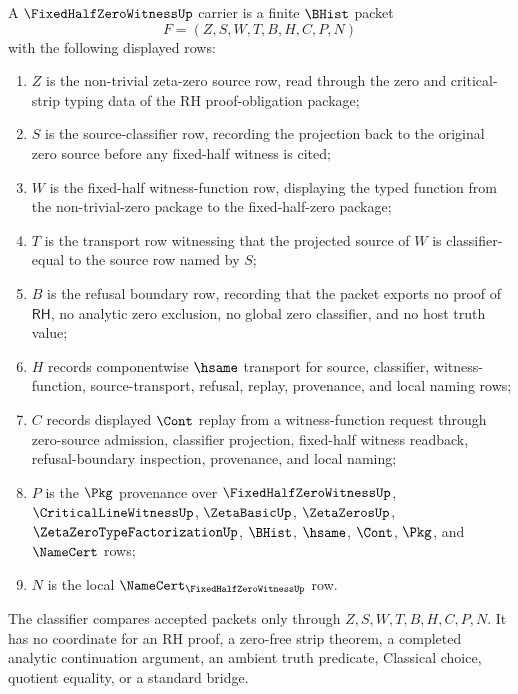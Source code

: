 \begin{definition}
\label{def:fixed-half-zero-witness-carrier}
A $\FixedHalfZeroWitnessUp$ carrier is a finite $\BHist$ packet
$$
F=(Z,S,W,T,B,H,C,P,N)
$$
with the following displayed rows:
\begin{enumerate}
\item $Z$ is the non-trivial zeta-zero source row, read through the zero and critical-strip typing data of the RH proof-obligation package;
\item $S$ is the source-classifier row, recording the projection back to the original zero source before any fixed-half witness is cited;
\item $W$ is the fixed-half witness-function row, displaying the typed function from the non-trivial-zero package to the fixed-half-zero package;
\item $T$ is the transport row witnessing that the projected source of $W$ is classifier-equal to the source row named by $S$;
\item $B$ is the refusal boundary row, recording that the packet exports no proof of $\mathsf{RH}$, no analytic zero exclusion, no global zero classifier, and no host truth value;
\item $H$ records componentwise $\hsame$ transport for source, classifier, witness-function, source-transport, refusal, replay, provenance, and local naming rows;
\item $C$ records displayed $\Cont$ replay from a witness-function request through zero-source admission, classifier projection, fixed-half witness readback, refusal-boundary inspection, provenance, and local naming;
\item $P$ is the $\Pkg$ provenance over $\FixedHalfZeroWitnessUp$, $\CriticalLineWitnessUp$, $\ZetaBasicUp$, $\ZetaZerosUp$, $\ZetaZeroTypeFactorizationUp$, $\BHist$, $\hsame$, $\Cont$, $\Pkg$, and $\NameCert$ rows;
\item $N$ is the local $\NameCert_{\FixedHalfZeroWitnessUp}$ row.
\end{enumerate}
The classifier compares accepted packets only through $Z,S,W,T,B,H,C,P,N$. It has no coordinate for an RH proof, a zero-free strip theorem, a completed analytic continuation argument, an ambient truth predicate, Classical choice, quotient equality, or a standard bridge.
\end{definition}

